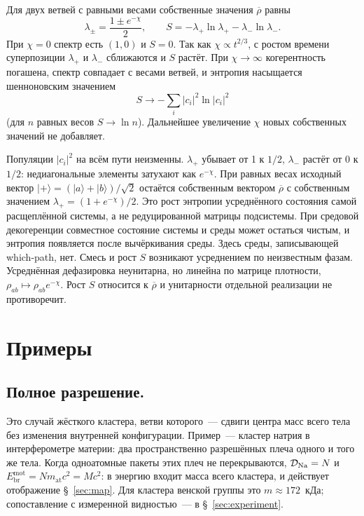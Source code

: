 \documentclass[12pt,a4paper]{article}
\begin{document}
Для двух ветвей с равными весами собственные значения $\overline{\rho}$ равны
\begin{equation}
\lambda_\pm=\frac{1\pm e^{-\chi}}{2},
\qquad
S=-\lambda_+\ln\lambda_+-\lambda_-\ln\lambda_-.
\label{eq:Stwo}
\end{equation}
При $\chi=0$ спектр есть $(1,0)$ и $S=0$. Так как $\chi\propto t^{2/3}$, с ростом времени суперпозиции $\lambda_+$ и $\lambda_-$ сближаются и $S$ растёт. При $\chi\to\infty$ когерентность погашена, спектр совпадает с весами ветвей, и энтропия насыщается шенноновским значением
\begin{equation}
S\to-\sum_i|c_i|^2\ln|c_i|^2
\label{eq:Ssat}
\end{equation}
(для $n$ равных весов $S\to\ln n$). Дальнейшее увеличение $\chi$ новых собственных значений не добавляет.

Популяции $|c_i|^2$ на всём пути неизменны. $\lambda_+$ убывает от 1 к $1/2$, $\lambda_-$ растёт от 0 к $1/2$: недиагональные элементы затухают как $e^{-\chi}$. При равных весах исходный вектор $|+\rangle=(|a\rangle+|b\rangle)/\sqrt{2}$ остаётся собственным вектором $\overline{\rho}$ с собственным значением $\lambda_+=(1+e^{-\chi})/2$. Это рост энтропии усреднённого состояния самой расщеплённой системы, а не редуцированной матрицы подсистемы. При средовой декогеренции совместное состояние системы и среды может остаться чистым, и энтропия появляется после вычёркивания среды. Здесь среды, записывающей which-path, нет. Смесь и рост $S$ возникают усреднением по неизвестным фазам. Усреднённая дефазировка неунитарна, но линейна по матрице плотности, $\rho_{ab}\mapsto\rho_{ab}e^{-\chi}$. Рост $S$ относится к $\overline{\rho}$ и унитарности отдельной реализации не противоречит.

\section{Примеры}
\label{sec:branch_examples}

\subsection{Полное разрешение.}
\label{sec:full_resolution}
Это случай жёсткого кластера, ветви которого~--- сдвиги центра масс всего тела без изменения внутренней конфигурации. Пример~--- кластер натрия в интерферометре материи: два пространственно разрешённых плеча одного и того же тела. Когда одноатомные пакеты этих плеч не перекрываются, $\mathcal D_{\rm Na}=N$ и $E_{\mathrm{br}}^{\mathrm{mot}}=Nm_{\mathrm{at}}c^2=Mc^2$: в энергию входит масса всего кластера, и действует отображение \S~\ref{sec:map}. Для кластера венской группы это $m\approx172$~кДа; сопоставление с измеренной видностью~--- в \S~\ref{sec:experiment}.
\end{document}
